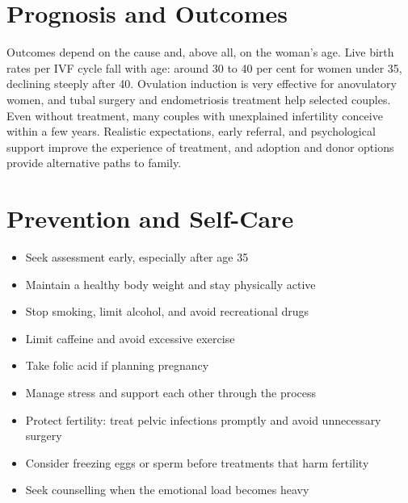 \section*{Prognosis and Outcomes}
Outcomes depend on the cause and, above all, on the woman's age. Live birth rates per IVF cycle fall with age: around 30 to 40 per cent for women under 35, declining steeply after 40. Ovulation induction is very effective for anovulatory women, and tubal surgery and endometriosis treatment help selected couples. Even without treatment, many couples with unexplained infertility conceive within a few years. Realistic expectations, early referral, and psychological support improve the experience of treatment, and adoption and donor options provide alternative paths to family.

\section*{Prevention and Self-Care}
\begin{itemize}
    \item Seek assessment early, especially after age 35
    \item Maintain a healthy body weight and stay physically active
    \item Stop smoking, limit alcohol, and avoid recreational drugs
    \item Limit caffeine and avoid excessive exercise
    \item Take folic acid if planning pregnancy
    \item Manage stress and support each other through the process
    \item Protect fertility: treat pelvic infections promptly and avoid unnecessary surgery
    \item Consider freezing eggs or sperm before treatments that harm fertility
    \item Seek counselling when the emotional load becomes heavy
\end{itemize}

